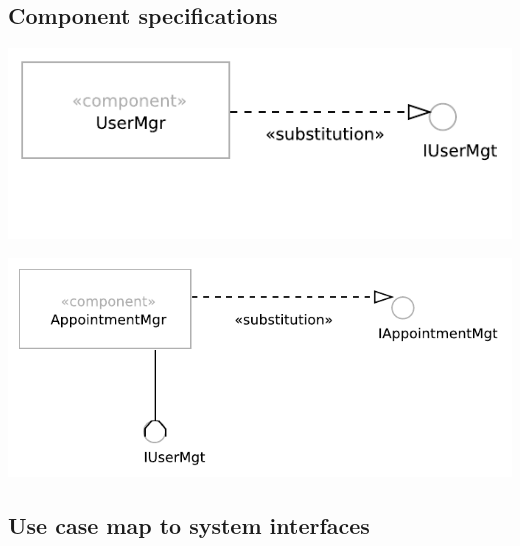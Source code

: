 \documentclass[a4paper]{scrartcl}
\begin{document}
\subsection{Component specifications}

\includegraphics{pictures/UserMgr}

\includegraphics{pictures/AppointmentMgr}

\subsection{Use case map to system interfaces}
\end{document}
